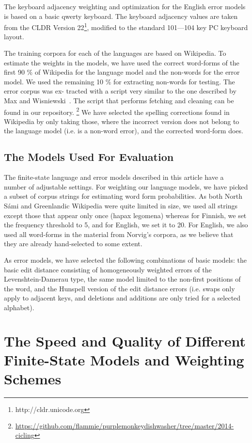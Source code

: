 \documentclass[postprint]{flammie}
\begin{document}
The keyboard adjacency weighting and optimization for the English error models
is based on a basic qwerty keyboard. The keyboard adjacency values are taken
from the CLDR Version 22\footnote{http://cldr.unicode.org}, modified to the
standard 101—104 key PC keyboard layout.

The training corpora for each of the languages are based on Wikipedia. To
estimate the weights in the models, we have used the correct word-forms of the
first 90 \% of Wikipedia for the language model and the non-words for the error
model. We used the remaining 10 \% for extracting non-words for testing. The
error corpus was ex- tracted with a script very similar to the one described by
Max and Wisniewski~\cite{max2010mining}.  The script that performs fetching and
cleaning can be found in our repository.
\footnote{\url{https://github.com/flammie/purplemonkeydishwasher/tree/master/2014-cicling}}
We have selected the
spelling corrections found in Wikipedia by only taking those, where the
incorrect version does not belong to the language model (i.e. is a non-word
error), and the corrected word-form does.

\subsection{The Models Used For Evaluation}

The finite-state language and error models described in this article have a
number of adjustable settings. For weighting our language models, we have
picked a subset of corpus strings for estimating word form probabilities. As
both North Sámi and Greenlandic Wikipedia were quite limited in size, we used
all strings except those that appear only once (hapax legomena) whereas for
Finnish, we set the frequency threshold to 5, and for English, we set it to 20.
For English, we also used all word-forms in the material from Norvig’s corpora,
as we believe that they are already hand-selected to some extent.

As error models, we have selected the following combinations of basic models:
the basic edit distance consisting of homogeneously weighted errors of the
Levenshtein-Damerau type, the same model limited to the non-first positions of
the word, and the Hunspell version of the edit distance errors (i.e. swaps only
apply to adjacent keys, and deletions and additions are only tried for a
selected alphabet).

\section{The Speed and Quality of Different Finite-State Models and
Weighting Schemes}
\end{document}
